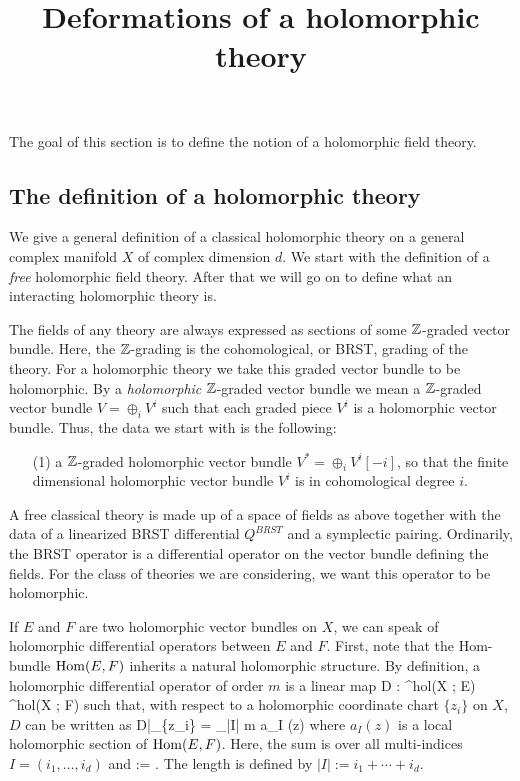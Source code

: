 \documentclass[10pt]{amsart}
\title{Deformations of a holomorphic theory}
\begin{document}
The goal of this section is to define the notion of a holomorphic field theory. 

\subsection{The definition of a holomorphic theory}

We give a general definition of a classical holomorphic theory on a general complex manifold $X$ of complex dimension $d$.
We start with the definition of a {\em free} holomorphic field theory. 
After that we will go on to define what an interacting holomorphic theory is.

The fields of any theory are always expressed as sections of some $\mathbb Z$-graded vector bundle.
Here, the $\mathbb Z$-grading is the cohomological, or BRST, grading of the theory.
For a holomorphic theory we take this graded vector bundle to be holomorphic.  
By a {\em holomorphic} $\mathbb Z$-graded vector bundle we mean a $\mathbb Z$-graded vector bundle $
V = \oplus_i V^i$ such that each graded piece $V^i$ is a holomorphic vector bundle. 
Thus, the data we start with is the following:

\begin{itemize}
\item[(1)] a $\mathbb Z$-graded holomorphic vector bundle $V^* = \oplus_i V^i [-i]$, so that the finite dimensional holomorphic vector bundle $V^i$ is in cohomological degree $i$. 
\end{itemize}

A free classical theory is made up of a space of fields as above together with the data of a linearized BRST differential $Q^{BRST}$ and a symplectic pairing. 
Ordinarily, the BRST operator is a differential operator on the vector bundle defining the fields. 
For the class of theories we are considering, we want this operator to be holomorphic. 

If $E$ and $F$ are two holomorphic vector bundles on $X$, we can speak of holomorphic differential operators between $E$ and $F$. 
First, note that the Hom-bundle ${\rm Hom}(E,F)$ inherits a natural holomorphic structure. 
By definition, a holomorphic differential operator of order $m$ is a linear map
\ben
D : \Gamma^{hol}(X ; E) \to \Gamma^{hol}(X ; F)
\een
such that, with respect to a holomorphic coordinate chart $\{z_i\}$ on $X$, $D$ can be written as
\be\label{local holomorphic}
D|_{\{z_i\}} = \sum_{|I| \leq m} a_I (z) 
\ee
where $a_I(z)$ is a local holomorphic section of ${\rm Hom}(E,F)$.
Here, the sum is over all multi-indices $I = (i_1,\ldots, i_d)$ and 
\ben
{} :=  . 
\een 
The length is defined by $|I| := i_1 + \cdots + i_d$. 
\end{document}
